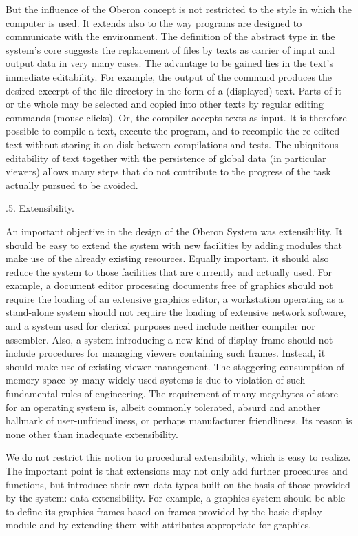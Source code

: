 But the influence of the Oberon concept is not restricted to the style
in which the computer is used. It extends also to the way programs are
designed to communicate with the environment. The definition of the
abstract type  in the system's core suggests the replacement
of files by texts as carrier of input and output data in very many
cases. The advantage to be gained lies in the text's immediate
editability. For example, the output of the command 
produces the desired excerpt of the file directory
in the form of a (displayed) text. Parts of it or the whole may be
selected and copied into other texts by regular editing commands
(mouse clicks). Or, the compiler accepts texts as input. It is
therefore possible to compile a text, execute the program, and to
recompile the re-edited text without storing it on disk between
compilations and tests. The ubiquitous editability of text together
with the persistence of global data (in particular viewers) allows
many steps that do not contribute to the progress of the task actually
pursued to be avoided.

.5. Extensibility.

An important objective in the design of the Oberon System was
extensibility. It should be easy to extend the system with new
facilities by adding modules that make use of the already existing
resources. Equally important, it should also reduce the system to
those facilities that are currently and actually used. For example, a
document editor processing documents free of graphics should not
require the loading of an extensive graphics editor, a workstation
operating as a stand-alone system should not require the loading of
extensive network software, and a system used for clerical purposes
need include neither compiler nor assembler. Also, a system
introducing a new kind of display frame should not include procedures
for managing viewers containing such frames. Instead, it should make
use of existing viewer management. The staggering consumption of
memory space by many widely used systems is due to violation of such
fundamental rules of engineering. The requirement of many megabytes of
store for an operating system is, albeit commonly tolerated, absurd
and another hallmark of user-unfriendliness, or perhaps manufacturer
friendliness. Its reason is none other than inadequate extensibility.

We do not restrict this notion to procedural extensibility, which is
easy to realize. The important point is that extensions may not only
add further procedures and functions, but introduce their own data
types built on the basis of those provided by the system: data
extensibility. For example, a graphics system should be able to define
its graphics frames based on frames provided by the basic display
module and by extending them with attributes appropriate for graphics.


